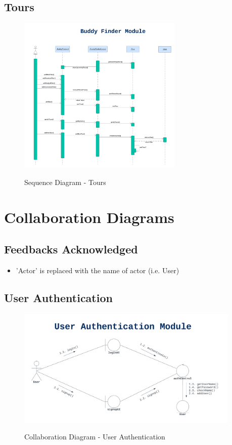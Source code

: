 \documentclass[12pt]{article}
\begin{document}
\subsection{Tours}
\begin{figure}[H]
    \centering
        \includegraphics[width=0.70\textwidth]{Sequence Diagram/BuddyFinder.png}
        \label{fig:SeqTours}
    \caption{Sequence Diagram - Tours}
\end{figure}

\newpage

\section{Collaboration Diagrams}
\subsection{Feedbacks Acknowledged}

\begin{itemize}
    \item 'Actor' is replaced with the name of actor (i.e. User) 
\end{itemize}

\subsection{User Authentication}
\begin{figure}[H]
    \centering
        \includegraphics[width=0.95\textwidth]{Collaboration Diagram/Authentication.png}
        \label{fig:CollabAuth}
    \caption{Collaboration Diagram - User Authentication}
\end{figure}
\end{document}
